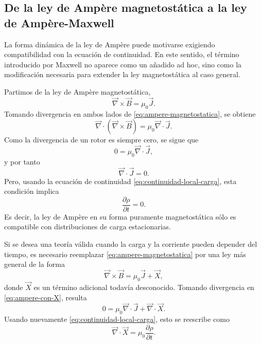 \documentclass[12pt,a4paper]{article}
\theoremstyle{definition}
\theoremstyle{plain}
\numberwithin{equation}{section}
\theoremstyle{remark}
\newcommand{\B}{\vec{B}}
\newcommand{\J}{\vec{J}}
\begin{document}
\subsection{De la ley de Ampère magnetostática a la ley de Ampère-Maxwell}

La forma dinámica de la ley de Ampère puede motivarse exigiendo compatibilidad con la ecuación de continuidad. En este sentido, el término introducido por Maxwell no aparece como un añadido ad hoc, sino como la modificación necesaria para extender la ley magnetostática al caso general.

Partimos de la ley de Ampère magnetostática,
\begin{equation}
    \vec\nabla\times\B=\mu_0\J.
    \label{eq:ampere-magnetostatica}
\end{equation}
Tomando divergencia en ambos lados de \eqref{eq:ampere-magnetostatica}, se obtiene
\begin{equation*}
    \vec\nabla\cdot(\vec\nabla\times\B)=\mu_0\vec\nabla\cdot\J.
\end{equation*}
Como la divergencia de un rotor es siempre cero, se sigue que
\begin{equation*}
    0=\mu_0\vec\nabla\cdot\J,
\end{equation*}
y por tanto
\begin{equation*}
    \vec\nabla\cdot\J=0.
\end{equation*}
Pero, usando la ecuación de continuidad \eqref{eq:continuidad-local-carga}, esta condición implica
\begin{equation*}
    \frac{\partial \rho}{\partial t}=0.
\end{equation*}
Es decir, la ley de Ampère en su forma puramente magnetostática sólo es compatible con distribuciones de carga estacionarias.

Si se desea una teoría válida cuando la carga y la corriente pueden depender del tiempo, es necesario reemplazar \eqref{eq:ampere-magnetostatica} por una ley más general de la forma
\begin{equation}
    \vec\nabla\times\B=\mu_0\J+\vec X,
    \label{eq:ampere-con-X}
\end{equation}
donde $\vec X$ es un término adicional todavía desconocido. Tomando divergencia en \eqref{eq:ampere-con-X}, resulta
\begin{equation*}
    0=\mu_0\vec\nabla\cdot\J+\vec\nabla\cdot\vec X.
\end{equation*}
Usando nuevamente \eqref{eq:continuidad-local-carga}, esto se reescribe como
\begin{equation}
    \vec\nabla\cdot\vec X=\mu_0\frac{\partial \rho}{\partial t}.
    \label{eq:divX}
\end{equation}
\end{document}
